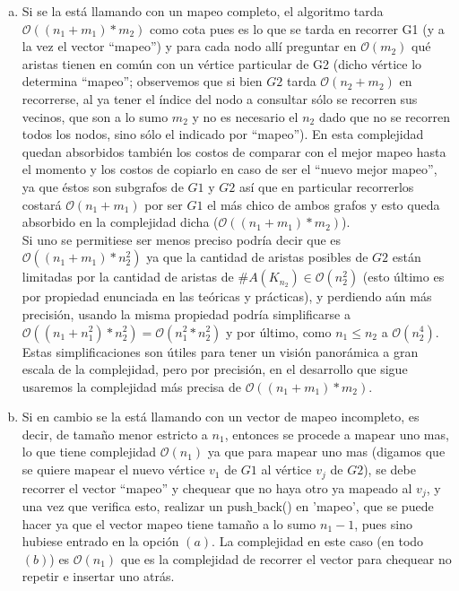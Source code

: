 \begin{enumerate}[(a)]
  
\item Si se la está llamando con un mapeo completo, el algoritmo tarda $\mathcal{O}((n_1 + m_1)*m_2)$ como cota pues es lo que se tarda en recorrer G1 (y a la vez el vector ``mapeo'') y para cada nodo allí preguntar en $\mathcal{O}(m_2)$ qué aristas tienen en común con un vértice particular de G2 (dicho vértice lo determina ``mapeo''; observemos que si bien $G2$ tarda $\mathcal{O}(n_2+m_2)$ en recorrerse, al ya tener el índice del nodo a consultar sólo se recorren sus vecinos, que son a lo sumo $m_2$ y no es necesario el $n_2$ dado que no se recorren todos los nodos, sino sólo el indicado por ``mapeo''). En esta complejidad quedan absorbidos también los costos de comparar con el mejor mapeo hasta el momento y los costos de copiarlo en caso de ser el ``nuevo mejor mapeo'', ya que éstos son subgrafos de $G1$ y $G2$ así que en particular recorrerlos costará $\mathcal{O}(n_1+m_1)$ por ser $G1$ el más chico de ambos grafos y esto queda absorbido en la complejidad dicha ($\mathcal{O}((n_1 + m_1)*m_2)$).\\
Si uno se permitiese ser menos preciso podría decir que es $\mathcal{O}((n_1+m_1)*n_2^2)$ ya que la cantidad de aristas posibles de $G2$ están limitadas por la cantidad de aristas de $ \# A(K_{n_2}) \in \mathcal{O}(n_2^2)$ (esto último es por propiedad enunciada en las teóricas y prácticas), y perdiendo aún más precisión, usando la misma propiedad podría simplificarse a $\mathcal{O}((n_1+n_1^2)*n_2^2) = \mathcal{O}(n_1^2*n_2^2)$ y por último, como $n_1 \leq n_2$ a $\mathcal{O}(n_2^4)$. Estas simplificaciones son útiles para tener un visión panorámica a gran escala de la complejidad, pero por precisión, en el desarrollo que sigue usaremos la complejidad más precisa de $\mathcal{O}((n_1 + m_1)*m_2)$.
\item Si en cambio se la está llamando con un vector de mapeo incompleto, es decir, de tamaño menor estricto a $n_1$, entonces se procede a mapear uno mas, lo que tiene complejidad $\mathcal{O}(n_1)$ ya que para mapear uno mas (digamos que se quiere mapear el nuevo vértice $v_1$ de $G1$ al vértice $v_j$ de $G2$), se debe recorrer el vector ``mapeo'' y chequear que no haya otro ya mapeado al $v_j$, y una vez que verifica esto, realizar un push$\_$back() en 'mapeo', que se puede hacer ya que el vector mapeo tiene tamaño a lo sumo $n_1 - 1$, pues sino hubiese entrado en la opción $(a)$. La complejidad en este caso (en todo $(b)$) es $\mathcal{O}(n_1)$ que es la complejidad de recorrer el vector para chequear no repetir e insertar uno atrás.\\
\end{enumerate}

